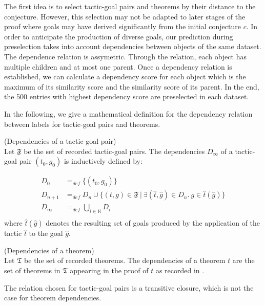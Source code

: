 \documentclass[runningheads,a4paper,draft]{svjour3}
\begin{document}
The first idea is to select tactic-goal pairs and theorems by their distance to 
the conjecture. However, this selection may not be adapted to later stages of 
the proof where goals may have derived significantly from the 
initial conjecture $c$. In order to 
anticipate the production of diverse goals, our prediction during preselection
takes into account dependencies between objects of the same dataset.
The dependence relation is assymetric. Through the relation, each object has 
multiple children and at most one parent.
Once a dependency relation is established, we can calculate a dependency score 
for each object which is the maximum of its similarity score and the similarity 
score of its parent. In the end, the 500 entries with highest dependency score 
are preselected in each dataset.

In the following, we give a mathematical definition for the dependency relation 
between labels for tactic-goal pairs and theorems.

\begin{definition}(Dependencies of a tactic-goal pair)\\
Let $\mathfrak{F}$ be the set of recorded tactic-goal pairs.
The dependencies $D_\infty$ of a tactic-goal pair $(t_0,g_0)$ is 
inductively defined by:

\begin{align*}
D_0 &=_{def} \lbrace (t_0,g_0) \rbrace \\
D_{n+1} &=_{def} D_n \cup \lbrace (t,g)\in \mathfrak{F}\  |\ \exists 
(\hat{t},\hat{g}) \in D_n.\ g \in \hat{t}(\hat{g}) \rbrace  \\
D_\infty &=_{def} \bigcup_{i \in \mathbb{N}} D_i\\
\end{align*}
where $\hat{t}(\hat{g})$ denotes the resulting set of goals produced by the 
application 
of the tactic $\hat{t}$ to the goal $\hat{g}$.
\end{definition}


\begin{definition}(Dependencies of a theorem)\\
Let $\mathfrak{T}$ be the set of recorded theorems.
The dependencies of a theorem $t$ are the set of theorems in 
$\mathfrak{T}$ appearing in the proof of $t$ as recorded in 
\cite{tgck-cpp15}.
\end{definition}

\begin{remark}
The relation chosen for tactic-goal pairs is a transitive 
closure, which is not the case for theorem dependencies.
\end{remark}
\end{document}
